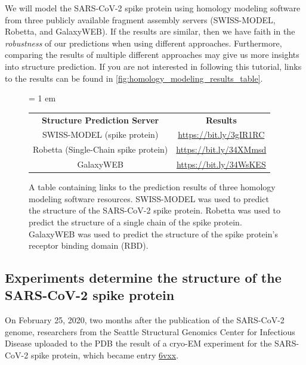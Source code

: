We will model the SARS-CoV-2 spike protein using homology modeling software from three publicly available fragment assembly servers (SWISS-MODEL, Robetta, and GalaxyWEB). If the results are similar, then we have faith in the \textit{robustness} of our predictions when using different approaches. Furthermore, comparing the results of multiple different approaches may give us more insights into structure prediction. If you are not interested in following this tutorial, links to the results can be found in \autoref{fig:homology_modeling_results_table}.\\

\begin{figure}[h]
	\centering
	\tabcolsep = 1 em
	\mySfFamily
	\begin{tabular}{c c}
		\textbf{Structure Prediction Server} & \textbf{Results} \\
		SWISS-MODEL (spike protein) & \url{https://bit.ly/3gIR1RC} \\
		Robetta (Single-Chain spike protein) & \url{https://bit.ly/34XMmsd} \\
		GalaxyWEB & \url{https://bit.ly/34WsKES} \\
	\end{tabular}
	\caption{A table containing links to the prediction results of three homology modeling software resources. SWISS-MODEL was used to predict the structure of the SARS-CoV-2 spike protein. Robetta was used to predict the structure of a single chain of the spike protein. GalaxyWEB was used to predict the structure of the spike protein's receptor binding domain (RBD).}
	\label{fig:homology_modeling_results_table}
\end{figure}

\FloatBarrier

\subsection{Experiments determine the structure of the SARS-CoV-2 spike protein}

On February 25, 2020, two months after the publication of the SARS-CoV-2 genome, researchers from the Seattle Structural Genomics Center for Infectious Disease uploaded to the PDB the result of a cryo-EM experiment for the SARS-CoV-2 spike protein, which became entry \href{http://www.rcsb.org/structure/6VXX}{6vxx}.\\

\begin{note}\end{note}

